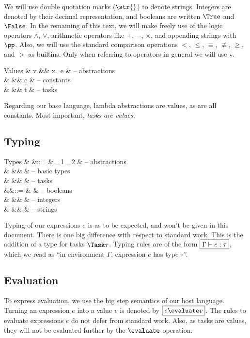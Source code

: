 We will use double quotation marks ($\str{}$) to denote strings.
Integers are denoted by their decimal representation,
and booleans are written $\True$ and $\False$.
In the remaining of this text,
we will make freely use of the logic operators $\land$, $\lor$,
arithmetic operators like $+$, $-$, $\times$,
and appending strings with $\pp$.
Also, we will use the standard comparison operations $<$, $\le$, $\equiv$, $\nequiv$, $\ge$, and $>$
as builtins.
Only when referring to operators in general we will use $\star$.



\begin{grammar}
  Values
    & v &\mid& \lambda x.\ e  & – abstractions \\
    &   &\mid& c              & – constants \\
    &   &\mid& t              & – tasks \\
\end{grammar}
Regarding our base language, lambda abstractions are values, as are all constants.
Most important, \emph{tasks are values}.


\subsection{Typing}

\begin{grammar}
  Types
    & \tau &::= & \tau_1 \to \tau_2 & – abstractions \\
    &      &\mid& \beta             & – basic types \\
    &      &\mid& \Task \tau        & – tasks \\
    &\beta &::= & \Bool             & – booleans \\
    &      &\mid& \Int              & – integers \\
    &      &\mid& \String           & – strings \\
\end{grammar}
Typing of our expressions $e$ is as to be expected,
and won't be given in this document.
There is one big difference with respect to standard work.
This is the addition of a type for tasks $\Task \tau$.
Typing rules are of the form $\boxed{\Gamma \vdash e : \tau}$,
which we read as \enquote{in environment $\Gamma$, expression $e$ has type $\tau$}.


\subsection{Evaluation}

To express evaluation,
we use the big step semantics of our host language.
Turning an expression $e$ into a value $v$ is denoted by $\boxed{e \evaluate v}$.
The rules to evaluate expressions $e$ do not defer from standard work.
Also, as tasks are values, they will not be evaluated further by the $\evaluate$ operation.
